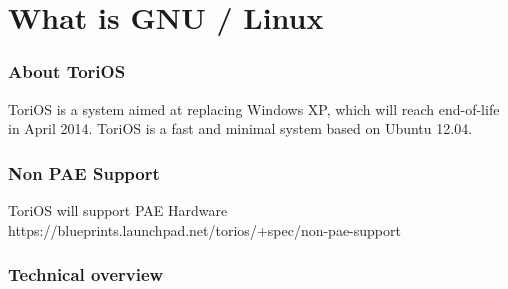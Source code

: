 \documentclass[12pt,a4paper]{book}
\begin{document}
\chapter{What is GNU / Linux}


\subsection{About ToriOS}

ToriOS is a system aimed at replacing Windows XP, which will reach end-of-life in April 2014. ToriOS is a fast and minimal system based on Ubuntu 12.04. 
\subsection{Non PAE Support}

ToriOS will support PAE Hardware\\
https://blueprints.launchpad.net/torios/+spec/non-pae-support

\subsection{Technical overview}
\end{document}
